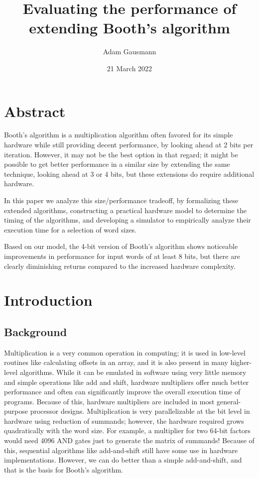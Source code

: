 \documentclass[12pt]{article}
\begin{document}
\title{Evaluating the performance of extending Booth's algorithm}
\author{Adam Gausmann}
\date{21 March 2022}
\maketitle

\section*{Abstract}

Booth's algorithm is a multiplication algorithm often favored for its
simple hardware while still providing decent performance, by looking ahead at 2
bits per iteration. However, it may not be the best option in that regard; it
might be possible to get better performance in a similar size by extending the
same technique, looking ahead at 3 or 4 bits, but these extensions do require
additional hardware.

In this paper we analyze this size/performance tradeoff, by formalizing these
extended algorithms, constructing a practical hardware model to determine the
timing of the algorithms, and developing a simulator to empirically analyze
their execution time for a selection of word sizes.

Based on our model, the 4-bit version of Booth's algorithm shows noticeable
improvements in performance for input words of at least 8 bits, but there are
clearly diminishing returns compared to the increased hardware complexity.

\newpage

\section{Introduction}

\subsection{Background}

Multiplication is a very common operation in computing; it is used in low-level
routines like calculating offsets in an array, and it is also present in many
higher-level algorithms. While it can be emulated in software using very little
memory and simple operations like add and shift, hardware multipliers offer
much better performance and often can significantly improve the overall
execution time of programs. Because of this, hardware multipliers are included
in most general-purpose processor designs. Multiplication is very
parallelizable at the bit level in hardware using reduction of summands;
however, the hardware required grows quadratically with the word size. For
example, a multiplier for two 64-bit factors would need 4096 AND gates just to
generate the matrix of summands! Because of this, sequential algorithms like
add-and-shift still have some use in hardware implementations.  However, we can
do better than a simple add-and-shift, and that is the basis for Booth's
algorithm.
\end{document}
